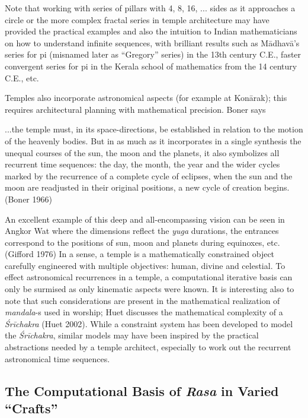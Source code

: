 Note that working with series of pillars with 4, 8, 16, ... sides as it approaches a circle or the more complex fractal series in temple architecture may have provided the practical examples and also the intuition to Indian mathematicians on how to understand infinite sequences, with brilliant results such as Mādhavā’s series for pi (misnamed later as “Gregory” series) in the 13th century C.E., faster convergent series for pi in the Kerala school of mathematics from the 14 century C.E., etc.

Temples also incorporate astronomical aspects (for example at Konārak); this requires architectural planning with mathematical precision. Boner says 

\begin{myquote}
...the temple must, in its space-directions, be established in relation to the motion of the heavenly bodies. But in as much as it incorporates in a single synthesis the unequal courses of the sun, the moon and the planets, it also symbolizes all recurrent time sequences: the day, the month, the year and the wider cycles marked by the recurrence of a complete cycle of eclipses, when the sun and the moon are readjusted in their original positions, a new cycle of creation begins. 
\hfill(Boner 1966)
\end{myquote}

An excellent example of this deep and all-encompassing vision can be seen in Angkor Wat where the dimensions reflect the \textsl{yuga} durations, the entrances correspond to the positions of sun, moon and planets during equinoxes, etc. (Gifford 1976) In a sense, a temple is a mathematically constrained object carefully engineered with multiple objectives: human, divine and celestial. To effect astronomical recurrences in a temple, a computational iterative basis can only be surmised as only kinematic aspects were known. It is interesting also to note that such considerations are present in the mathematical realization of \textsl{mandala}-s used in worship; Huet discusses the mathematical complexity of a \textsl{Śrīchakra} (Huet 2002). While a constraint system has been developed to model the \textsl{Śrīchakra}, similar models may have been inspired by the practical abstractions needed by a temple architect, especially to work out the recurrent astronomical time sequences.\\[-20pt]

\subsection{The Computational Basis of \textsl{Rasa} in Varied “Crafts”}\label{chap3-sec5.4}

